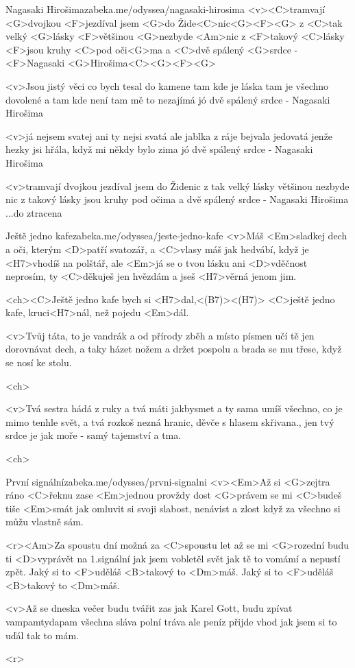 \begin{song}{41}{Nagasaki Hirošima}{zabeka.me/odyssea/nagasaki-hirosima}
<v><C>tramvají <G>dvojkou <F>jezdíval jsem <G>do Žide<C>nic<G><F><G>
z <C>tak velký <G>lásky <F>většinou <G>nezbyde <Am>nic
z <F>takový <C>lásky <F>jsou kruhy <C>pod oči<G>ma
a <C>dvě spálený <G>srdce - <F>Nagasaki <G>Hirošima<C><G><F><G>

<v>Jsou jistý věci co bych tesal do kamene
tam kde je láska tam je všechno dovolené
a tam kde není tam mě to nezajímá
jó dvě spálený srdce - Nagasaki Hirošima

<v>já nejsem svatej ani ty nejsi svatá
ale jablka z ráje bejvala jedovatá
jenže hezky jsi hřála, když mi někdy bylo zima
jó dvě spálený srdce - Nagasaki Hirošima

<v>tramvají dvojkou jezdíval jsem do Židenic
z tak velký lásky většinou nezbyde nic
z takový lásky jsou kruhy pod očima
a dvě spálený srdce - Nagasaki Hirošima ...do ztracena
\end{song}
\begin{song}{42}{Ještě jedno kafe}{zabeka.me/odyssea/jeste-jedno-kafe}
<v>Máš <Em>sladkej dech a oči, kterým <D>patří svatozář,
a <C>vlasy máš jak hedvábí, když je <H7>vhodíš na polštář,
ale <Em>já se o tvou lásku ani <D>vděčnost neprosím,
ty <C>děkuješ jen hvězdám a jseš <H7>věrná jenom jim.

<ch><C>Ještě jedno kafe bych si <H7>dal,<(B7)><(H7)>
<C>ještě jedno kafe, kruci<H7>nál, než pojedu <Em>dál.

<v>Tvůj táta, to je vandrák a od přírody zběh
a místo písmen učí tě jen dorovnávat dech,
a taky házet nožem a držet pospolu
a brada se mu třese, když se nosí ke stolu.

<ch>

<v>Tvá sestra hádá z ruky a tvá máti jakbysmet
a ty sama umíš všechno, co je mimo tenhle svět,
a tvá rozkoš nezná hranic, děvče s hlasem skřivana.,
jen tvý srdce je jak moře - samý tajemství a tma.

<ch>
\end{song}
\begin{song}[Chinaski]{43}{První signální}{zabeka.me/odyssea/prvni-signalni}
<v><Em>Až si <G>zejtra ráno <C>řeknu zase 
<Em>jednou provždy dost 
<G>právem se mi <C>budeš tiše <Em>smát 
jak omluvit si svoji slabost, nenávist a zlost 
když za všechno si můžu vlastně sám. 

<r><Am>Za spoustu dní možná za <C>spoustu let 
až se mi <G>rozední budu ti <D>vyprávět 
na 1.signální jak jsem vobletěl svět 
jak tě to vomámí a nepustí zpět. 
Jaký si to <F>uděláš <B>takový to <Dm>máš. 
Jaký si to <F>uděláš <B>takový to <Dm>máš. 

<v>Až se dneska večer budu tvářit zas jak Karel Gott, 
budu zpívat vampamtydapam 
všechna sláva polní tráva ale peníz přijde vhod 
jak jsem si to uďál tak to mám. 

<r>
\end{song}

